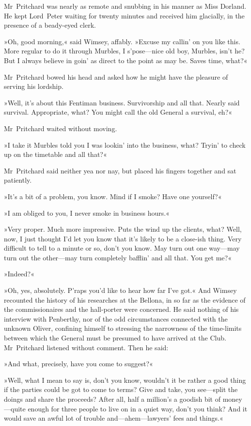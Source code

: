 Mr~Pritchard was nearly as remote and snubbing in his manner as Miss Dorland. He kept Lord~Peter waiting for twenty minutes and received him glacially, in the presence of a beady-eyed clerk.

»Oh, good morning,« said Wimsey, affably. »Excuse my callin' on you like this. More regular to do it through Murbles, I s'pose—nice old boy, Murbles, isn't he? But I always believe in goin' as direct to the point as may be. Saves time, what?«

Mr~Pritchard bowed his head and asked how he might have the pleasure of serving his lordship.

»Well, it's about this Fentiman business. Survivorship and all that. Nearly said survival. Appropriate, what? You might call the old General a survival, eh?«

Mr~Pritchard waited without moving.

»I take it Murbles told you I was lookin' into the business, what? Tryin' to check up on the timetable and all that?«

Mr~Pritchard said neither yea nor nay, but placed his fingers together and sat patiently.

»It's a bit of a problem, you know. Mind if I smoke? Have one yourself?«

»I am obliged to you, I never smoke in business hours.«

»Very proper. Much more impressive. Puts the wind up the clients, what? Well, now, I just thought I'd let you know that it's likely to be a close-ish thing. Very difficult to tell to a minute or so, don't you know. May turn out one way—may turn out the other—may turn completely bafflin' and all that. You get me?«

»Indeed?«

»Oh, yes, absolutely. P'raps you'd like to hear how far I've got.« And Wimsey recounted the history of his researches at the Bellona, in so far as the evidence of the commissionaires and the hall-porter were concerned. He said nothing of his interview with Penberthy, nor of the odd circumstances connected with the unknown Oliver, confining himself to stressing the narrowness of the time-limits between which the General must be presumed to have arrived at the Club. Mr~Pritchard listened without comment. Then he said:

»And what, precisely, have you come to suggest?«

»Well, what I mean to say is, don't you know, wouldn't it be rather a good thing if the parties could be got to come to terms? Give and take, you see—split the doings and share the proceeds? After all, half a million's a goodish bit of money—quite enough for three people to live on in a quiet way, don't you think? And it would save an awful lot of trouble and—ahem—lawyers' fees and things.«

